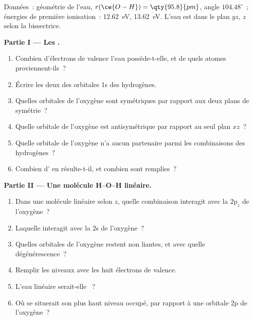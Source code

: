 \begin{problem}
\label{pb:b2:fragment-orbitals:1}
Données~: géométrie de l'eau, $r(\ce{O-H}) = \qty{95.8}{pm}$, angle
$104.48^\circ$~; énergies de première ionisation~:  \qty{12.62}{eV}, 
\qty{13.62}{eV}. L'eau est dans le plan $yz$, $z$ selon la bissectrice.

\medskip
\noindent\textbf{Partie I --- Les .}
\begin{enumerate}
  \item Combien d'électrons de valence l'eau possède-t-elle, et de quels atomes proviennent-ils~?
  \item Écrire les deux  des orbitales 1s des hydrogènes.
  \item Quelles orbitales de l'oxygène sont symétriques par rapport aux deux plans de symétrie~?
  \item Quelle orbitale de l'oxygène est antisymétrique par rapport au seul plan $xz$~?
  \item Quelle orbitale de l'oxygène n'a aucun partenaire parmi les combinaisons des hydrogènes~?
  \item Combien d' en résulte-t-il, et combien sont remplies~?
\end{enumerate}

\medskip
\noindent\textbf{Partie II --- Une molécule H--O--H linéaire.}
\begin{enumerate}[resume]
  \item Dans une molécule linéaire selon $z$, quelle combinaison interagit avec la
        $2\mathrm p_z$ de l'oxygène~?
  \item Laquelle interagit avec la 2s de l'oxygène~?
  \item Quelles orbitales de l'oxygène restent non liantes, et avec quelle dégénérescence~?
  \item Remplir les niveaux avec les huit électrons de valence.
  \item L'eau linéaire serait-elle ~?
  \item Où se situerait son plus haut niveau occupé, par rapport à une orbitale 2p de
        l'oxygène~?
\end{enumerate}


\end{problem}
